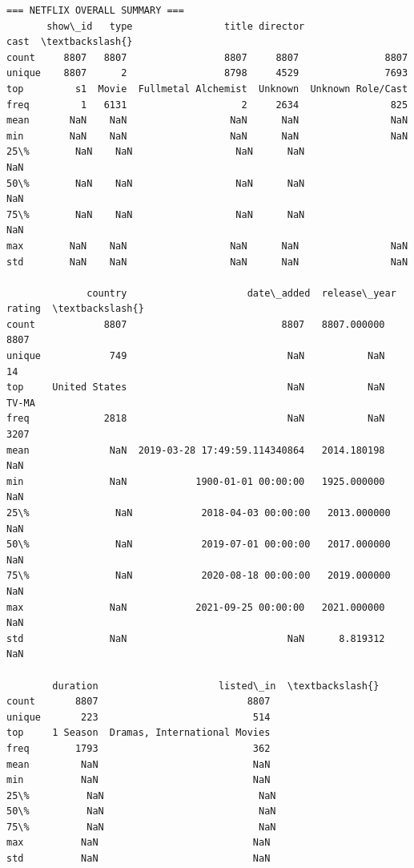 \documentclass[11pt]{article}
\begin{document}
    \begin{Verbatim}[commandchars=\\\{\}]
=== NETFLIX OVERALL SUMMARY ===
       show\_id   type                title director               cast  \textbackslash{}
count     8807   8807                 8807     8807               8807
unique    8807      2                 8798     4529               7693
top         s1  Movie  Fullmetal Alchemist  Unknown  Unknown Role/Cast
freq         1   6131                    2     2634                825
mean       NaN    NaN                  NaN      NaN                NaN
min        NaN    NaN                  NaN      NaN                NaN
25\%        NaN    NaN                  NaN      NaN                NaN
50\%        NaN    NaN                  NaN      NaN                NaN
75\%        NaN    NaN                  NaN      NaN                NaN
max        NaN    NaN                  NaN      NaN                NaN
std        NaN    NaN                  NaN      NaN                NaN

              country                     date\_added  release\_year rating  \textbackslash{}
count            8807                           8807   8807.000000   8807
unique            749                            NaN           NaN     14
top     United States                            NaN           NaN  TV-MA
freq             2818                            NaN           NaN   3207
mean              NaN  2019-03-28 17:49:59.114340864   2014.180198    NaN
min               NaN            1900-01-01 00:00:00   1925.000000    NaN
25\%               NaN            2018-04-03 00:00:00   2013.000000    NaN
50\%               NaN            2019-07-01 00:00:00   2017.000000    NaN
75\%               NaN            2020-08-18 00:00:00   2019.000000    NaN
max               NaN            2021-09-25 00:00:00   2021.000000    NaN
std               NaN                            NaN      8.819312    NaN

        duration                     listed\_in  \textbackslash{}
count       8807                          8807
unique       223                           514
top     1 Season  Dramas, International Movies
freq        1793                           362
mean         NaN                           NaN
min          NaN                           NaN
25\%          NaN                           NaN
50\%          NaN                           NaN
75\%          NaN                           NaN
max          NaN                           NaN
std          NaN                           NaN


\end{Verbatim}
\end{document}
